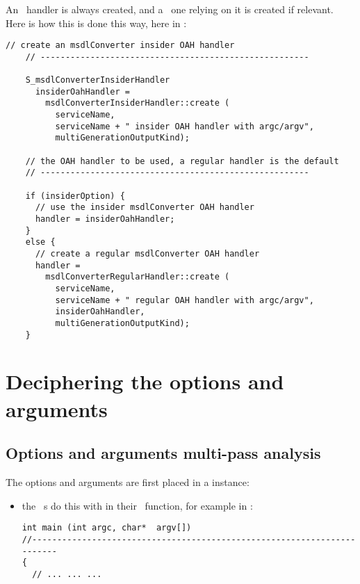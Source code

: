 {An \insider\ handler is always created, and a \regular\ one relying on it is created if relevant. Here is how this is done this way, here in :
\begin{lstlisting}[language=CPlusPlus]
    // create an msdlConverter insider OAH handler
    // ------------------------------------------------------

    S_msdlConverterInsiderHandler
      insiderOahHandler =
        msdlConverterInsiderHandler::create (
          serviceName,
          serviceName + " insider OAH handler with argc/argv",
          multiGenerationOutputKind);

    // the OAH handler to be used, a regular handler is the default
    // ------------------------------------------------------

    if (insiderOption) {
      // use the insider msdlConverter OAH handler
      handler = insiderOahHandler;
    }
    else {
      // create a regular msdlConverter OAH handler
      handler =
        msdlConverterRegularHandler::create (
          serviceName,
          serviceName + " regular OAH handler with argc/argv",
          insiderOahHandler,
          multiGenerationOutputKind);
    }
\end{lstlisting}


\section{Deciphering the options and arguments}

\subsection{Options and arguments multi-pass analysis}\label{Options and arguments multi-pass analysis}

The options and arguments are first placed in a  instance:
\begin{itemize}
\item the \CLI\ \service s do this with  in their \MainName\ function, for example in : %
\begin{lstlisting}[language=CPlusPlus]
int main (int argc, char*  argv[])
//------------------------------------------------------------------------
{
  // ... ... ...


\end{lstlisting}
\end{itemize}}

